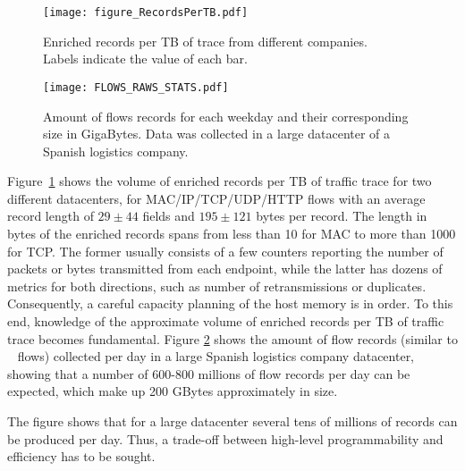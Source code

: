 \documentclass[AMA,STIX1COL]{WileyNJD-v2}
\begin{document}
\begin{figure*}[b]
\vspace{-2em}
  \begin{subfigure}[tbp]{0.60\textwidth}
    \centering
\texttt{[image: figure\_RecordsPerTB.pdf]}
\caption{Enriched records per TB of trace from different companies. \\ Labels indicate the value of each bar.}
\label{fig:perTB}
  \end{subfigure}
  \hfill %
  \begin{subfigure}[tbp]{0.42\textwidth}
      \centering
   \texttt{[image: FLOWS\_RAWS\_STATS.pdf]}
    \caption{Amount of flows records for each weekday and their corresponding size in GigaBytes. Data was collected in a large datacenter of a Spanish logistics company.}
    \label{fig:raws_flows_week}
  \end{subfigure}
  \caption{Statistics from different enterprise networks.}
\end{figure*}

Figure~\ref{fig:perTB} shows the volume of enriched records per TB of traffic trace for two different datacenters, for MAC/IP/TCP/UDP/HTTP flows with an average record length of $29\pm44$ fields and $195\pm121$ bytes per record. The length in bytes of the enriched records spans from less than 10 for MAC to more than 1000 for TCP. The former usually consists of a few counters reporting the number of packets or bytes transmitted from each endpoint, while the latter has dozens of metrics for both directions, such as number of retransmissions or duplicates. 
Consequently, a careful capacity planning of the host memory is in order. To this end, knowledge of the approximate volume of enriched records per TB of traffic trace becomes fundamental. Figure \ref{fig:raws_flows_week} shows the amount of flow records (similar to ~\cite[pg. 10]{M3OMON} flows) collected per day in a large Spanish logistics company datacenter, showing that a number of 600-800 millions of flow records per day can be expected, which make up 200 GBytes approximately in size.

The figure shows that for a large datacenter several tens of millions of records can be produced per day. Thus, a trade-off between high-level programmability and efficiency has to be sought.
\end{document}
